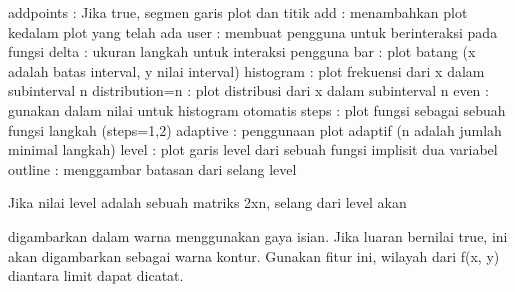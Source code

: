 \documentclass[a4paper,10pt]{article}
\begin{document}
\begin{eulernotebook}
\begin{eulercomment}
\begin{eulercomment}
\begin{eulercomment}
\begin{eulercomment}
\begin{eulerttcomment}
 addpoints : Jika true, segmen garis plot dan titik
 add       : menambahkan plot kedalam plot yang telah ada
 user      : membuat pengguna untuk berinteraksi pada fungsi
 delta     : ukuran langkah untuk interaksi pengguna
 bar       : plot batang (x adalah batas interval, y nilai interval)
 histogram : plot frekuensi dari x dalam subinterval n
 distribution=n : plot distribusi dari x dalam subinterval n
 even      : gunakan dalam nilai untuk histogram otomatis
 steps     : plot  fungsi sebagai sebuah fungsi langkah (steps=1,2)
 adaptive  : penggunaan plot adaptif (n adalah jumlah minimal langkah)
 level     : plot garis level dari sebuah fungsi implisit dua variabel
 outline   : menggambar batasan dari selang level
\end{eulerttcomment}
\begin{eulercomment}

\end{eulercomment}
\begin{eulerttcomment}
  Jika nilai level adalah sebuah matriks 2xn, selang dari level akan
\end{eulerttcomment}
\begin{eulercomment}
digambarkan dalam warna menggunakan gaya isian. Jika luaran bernilai
true, ini akan digambarkan sebagai warna kontur. Gunakan fitur ini,
wilayah dari f(x, y) diantara limit dapat dicatat.


\end{eulercomment}
\end{eulercomment}
\end{eulercomment}
\end{eulercomment}
\end{eulercomment}
\end{eulernotebook}
\end{document}
